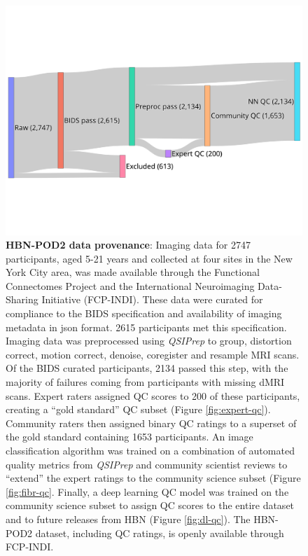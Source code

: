 \documentclass[fleqn,10pt,inline]{wlscirep}
\begin{document}
\begin{figure}[tbp]
    \centering
    \includegraphics[width=0.75\linewidth]{hbn-pod2-sankey.pdf}
    \caption{%
        {\bf HBN-POD2 data provenance}:
        Imaging data for \num{2747} participants, aged 5-21 years and collected at four
        sites in the New York City area, was made available through the
        Functional Connectomes Project and the International Neuroimaging
        Data-Sharing Initiative (FCP-INDI).
        These data were curated for compliance to the BIDS specification
        \cite{gorgolewski2016-lh} and availability of imaging metadata in json
        format. \num{2615} participants met this specification.
        Imaging data was preprocessed using \emph{QSIPrep} \cite{cieslak2021-iq}
        to group, distortion correct, motion correct, denoise, coregister and
        resample MRI scans. Of the BIDS curated participants, \num{2134}
        passed this step, with the majority of failures coming from participants
        with missing dMRI scans.
        Expert raters assigned QC scores to \num{200} of these participants,
        creating a ``gold standard'' QC subset (Figure \ref{fig:expert-qc}).
        Community raters then assigned
        binary QC ratings to a superset of the gold standard containing
        \num{1653} participants. An image classification algorithm was trained
        on a combination of automated quality metrics from \emph{QSIPrep} and community
        scientist reviews to ``extend'' the expert ratings to the community
        science subset (Figure \ref{fig:fibr-qc}.
        Finally, a deep learning QC model was trained on the
        community science subset to assign QC scores to the entire dataset and
        to future releases from HBN (Figure \ref{fig:dl-qc}).
        The HBN-POD2 dataset, including QC ratings, is openly available through
        FCP-INDI.
    }
    \label{fig:hbn-sankey}
\end{figure}
\end{document}
